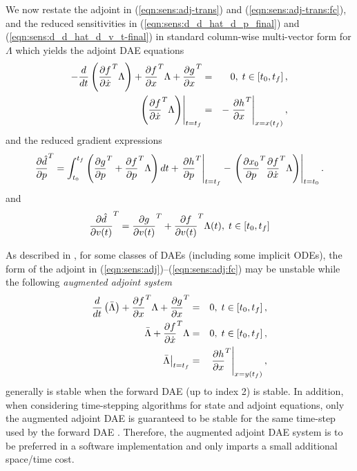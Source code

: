\documentclass[pdf,ps2pdf,11pt]{SANDreport}
\begin{document}
We now restate the adjoint in (\ref{eqn:sens:adj-trans}) and
(\ref{eqn:sens:adj-trans:fc}), and the reduced sensitivities in
(\ref{eqn:sens:d_d_hat_d_p_final}) and (\ref{eqn:sens:d_d_hat_d_v_t-final}) in
standard column-wise multi-vector form for $\Lambda$ which yields the adjoint
DAE equations
%
\begin{eqnarray}
- \frac{d}{dt}\left( \displaystyle{\frac{\partial f}{\partial \dot{x}}}^T \Lambda \right)
+  \displaystyle{\frac{\partial f}{\partial x}}^T \Lambda + \displaystyle{\frac{\partial g}{\partial x}}^T
& = & 0, \; t \in \left[ t_0, t_f \right],
\label{eqn:sens:adj} \\
\left.\left( \displaystyle{\frac{\partial f}{\partial \dot{x}}}^T \Lambda \right)\right|_{t=t_f}
& = & - \left. \displaystyle{\frac{\partial h}{\partial x}}^T \right|_{x=x(t_f)},
\label{eqn:sens:adj:fc}
\end{eqnarray}
%
and the reduced gradient expressions
%
\begin{equation}
\displaystyle{\frac{\partial \hat{d}}{\partial p}}^T =
\int_{t_0}^{t_f} \left(
    \displaystyle{\frac{\partial g}{\partial p}}^T
    + \displaystyle{\frac{\partial f}{\partial p}}^T \Lambda
  \right) dt
  + \left. \displaystyle{\frac{\partial h}{\partial p}}^T \right|_{t=t_f}
  - \left. \left( \displaystyle{\frac{\partial x_0}{\partial p}}^T \displaystyle{\frac{\partial f}{\partial \dot{x}}}^T \Lambda \right) \right|_{t=t_0}.
\label{eqn:sens:d_d_hat_d_p_final-2}
\end{equation}
%
and
%
\begin{equation}
\displaystyle{\frac{\partial \hat{d}}{\partial v(t)}}^T =  \displaystyle{\frac{\partial g}{\partial v(t)}}^T + \displaystyle{\frac{\partial f}{\partial v(t)}}^T \Lambda(t), \; t\in[t_0,t_f]
\label{eqn:sens:d_d_hat_d_v_t-final-2}
\end{equation}
%

As described in {}\cite{adjoint-sens-2003}, for some classes of DAEs
(including some implicit ODEs), the form of the adjoint in
(\ref{eqn:sens:adj})--(\ref{eqn:sens:adj:fc}) may be unstable while the
following {}\textit{augmented adjoint system}
%
\begin{eqnarray}
\frac{d}{dt}\left( \bar{\Lambda} \right)
+  \displaystyle{\frac{\partial f}{\partial x}}^T \Lambda + \displaystyle{\frac{\partial g}{\partial x}}^T
& = & 0, \; t \in \left[ t_0, t_f \right],
\label{eqn:sens:aug-adj-de} \\
\bar{\Lambda} + \displaystyle{\frac{\partial f}{\partial \dot{x}}}^T \Lambda
& = & 0, \; t \in \left[ t_0, t_f \right],
\label{eqn:sens:aug-adj-ae} \\
\left. \bar{\Lambda} \right|_{t=t_f}
& = & \left. \displaystyle{\frac{\partial h}{\partial x}}^T \right|_{x=y(t_f)},
\label{eqn:sens:aug-adj:fc}
\end{eqnarray}
%
generally is stable when the forward DAE (up to index 2) is stable.  In
addition, when considering time-stepping algorithms for state and adjoint
equations, only the augmented adjoint DAE is guaranteed to be stable for the
same time-step used by the forward DAE {}\cite{adjoint-sens-2003}.  Therefore,
the augmented adjoint DAE system is to be preferred in a software
implementation and only imparts a small additional space/time cost.
\end{document}

